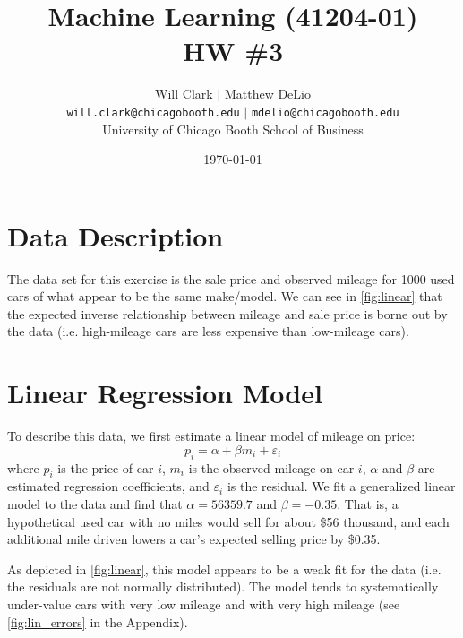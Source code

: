 \documentclass[11pt, fleqn]{article}
\begin{document}
\title{Machine Learning (41204-01)\\HW \#3}
\author{Will Clark $\vert$ Matthew DeLio \\
\texttt{will.clark@chicagobooth.edu} $\vert$ \texttt{mdelio@chicagobooth.edu} \\
University of Chicago Booth School of Business}
\date{\today}
\maketitle


\section{Data Description}

The data set for this exercise is the sale price and observed mileage for 1000 used cars of what appear to be the same make/model. We can see in \cref{fig:linear} that the expected inverse relationship between mileage and sale price is borne out by the data (i.e. high-mileage cars are less expensive than low-mileage cars).

\section{Linear Regression Model}\label{sec:linear}

To describe this data, we first estimate a linear model of mileage on price:
\[ p_i = \alpha + \beta m_i + \varepsilon_i \]
where \(p_i\) is the price of car \(i\), \(m_i\) is the observed mileage on car \(i\), \(\alpha\) and \(\beta\) are estimated regression coefficients, and \(\varepsilon_i\) is the residual. We fit a generalized linear model to the data and find that \(\alpha=56359.7\) and \(\beta=-0.35\). That is, a hypothetical used car with no miles would sell for about \$56 thousand, and each additional mile driven lowers a car's expected selling price by \$0.35.

As depicted in \cref{fig:linear}, this model appears to be a weak fit for the data (i.e. the residuals are not normally distributed). The model tends to systematically under-value cars with very low mileage and with very high mileage (see \cref{fig:lin_errors} in the Appendix). 
\end{document}
